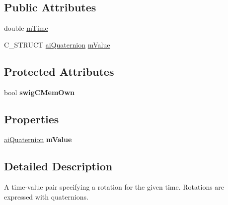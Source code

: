 \subsection*{Public Attributes}
\begin{DoxyCompactItemize}
\item 
double \hyperlink{structai_quat_key_afb56b697e491c918bdeb1b32d03bbcf8}{m\+Time}
\item 
C\+\_\+\+S\+T\+R\+U\+C\+T \hyperlink{structai_quaternion}{ai\+Quaternion} \hyperlink{structai_quat_key_a08bf706065137951fd89c5914bb5a2aa}{m\+Value}
\end{DoxyCompactItemize}
\subsection*{Protected Attributes}
\begin{DoxyCompactItemize}
\item 
\hypertarget{structai_quat_key_a80697be99db05f2fdff5b7d0bf71c257}{bool {\bfseries swig\+C\+Mem\+Own}}\label{structai_quat_key_a80697be99db05f2fdff5b7d0bf71c257}

\end{DoxyCompactItemize}
\subsection*{Properties}
\begin{DoxyCompactItemize}
\item 
\hypertarget{structai_quat_key_a449f653e8fd48538e92894cdf70a58da}{\hyperlink{structai_quaternion}{ai\+Quaternion} {\bfseries m\+Value}}\label{structai_quat_key_a449f653e8fd48538e92894cdf70a58da}

\end{DoxyCompactItemize}


\subsection{Detailed Description}
A time-\/value pair specifying a rotation for the given time. Rotations are expressed with quaternions. 


